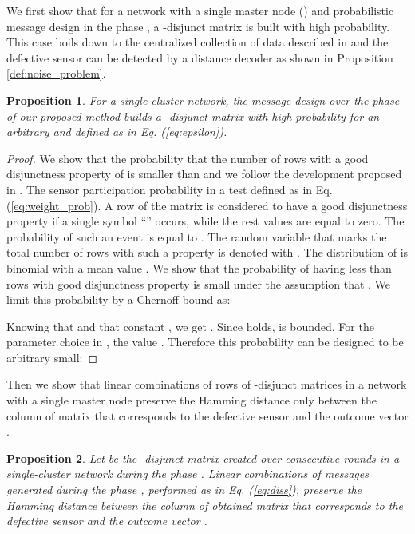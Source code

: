 \documentclass[journal]{IEEEtran}
\newtheorem{prop}{Proposition}
\begin{document}
We first show that for a network with a single master node () and probabilistic message design in the phase , a -disjunct matrix  is built with high probability. This case boils down to the centralized collection of data described in \cite{Cheraghchi:11} and the defective sensor can be detected by a distance decoder as shown in Proposition \ref{def:noise_problem}. 
\begin{prop} For a single-cluster network, the message design over the phase  of our proposed method builds a -disjunct matrix  with high probability for an arbitrary  and  defined as in Eq. (\ref{eq:epsilon}).
\label{prop:one}
\end{prop}
\begin{proof}
We show that the probability that the number of rows with a good disjunctness property  of  is smaller than  and we follow the development proposed in \cite{Cheraghchi:11}. The sensor participation probability  in a test defined as in Eq. (\ref{eq:weight_prob}). A row of the matrix  is considered to have a good disjunctness property if a single symbol ``'' occurs, while the rest  values are equal to zero. The probability of such an event is equal to . The random variable that marks the total number of rows with such a property is denoted with . The distribution of  is binomial with a mean value . We show that the probability of having less than  rows with good disjunctness property is small under the assumption that . We limit this probability by a Chernoff bound as:

Knowing that  and that constant , we get . Since  holds,  is bounded. For the parameter choice in \cite{Cheraghchi:11} , the value . Therefore this probability can be designed to be arbitrary small: 

\end{proof}
Then we show that linear combinations of rows of -disjunct matrices  in a network with a single master node preserve the Hamming distance only between the column of matrix  that corresponds to the defective sensor  and the outcome vector .
\begin{prop}
Let  be the -disjunct matrix created over consecutive  rounds in a single-cluster network during the phase . Linear combinations of messages generated during the phase , performed as in Eq. (\ref{eq:diss}), preserve the Hamming distance between the column of obtained matrix  that corresponds to the defective sensor  and the outcome vector . 
\label{prop:two}
\end{prop}
\end{document}
